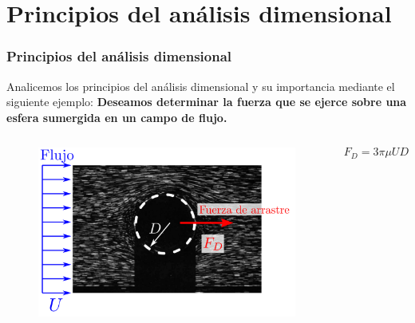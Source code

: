 \documentclass[t]{beamer}
\begin{document}
\section{Principios del análisis dimensional}
\begin{frame}
\frametitle{Principios del análisis dimensional}
Analicemos los principios del análisis dimensional y su importancia mediante el siguiente ejemplo: \textbf{Deseamos determinar la fuerza que se ejerce sobre una esfera sumergida en un campo de flujo.}
\begin{columns}[c]
\begin{figure}
\includegraphics[width=1\textwidth]{Figures/Stokes_sphere.png}
\end{figure}
{}

$$F_ D =   3\pi\mu U D$$

{}

\end{columns}
\end{frame}
\end{document}
